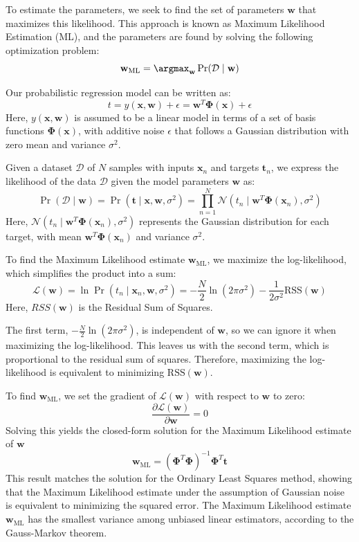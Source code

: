 To estimate the parameters, we seek to find the set of parameters $\mathbf{w}$ that maximizes this likelihood.
This approach is known as Maximum Likelihood Estimation (ML), and the parameters are found by solving the following optimization problem:
\[\mathbf{w}_{\text{ML}}=\argmax_{\mathbf{w}}\Pr(\mathcal{D}\mid\mathbf{w})\]

Our probabilistic regression model can be written as:
\[t=y(\mathbf{x},\mathbf{w})+\epsilon=\mathbf{w}^T\boldsymbol{\Phi}(\mathbf{x})+\epsilon\]
Here, $y(\mathbf{x},\mathbf{w})$ is assumed to be a linear model in terms of a set of basis functions $\boldsymbol{\Phi}(\mathbf{x})$, with additive noise $\epsilon$ that follows a Gaussian distribution with zero mean and variance $\sigma^2$. 

Given a dataset $\mathcal{D}$ of $N$ samples with inputs $\mathbf{x}_n$ and targets $\mathbf{t}_n$, we express the likelihood of the data $\mathcal{D}$ given the model parameters $\mathbf{w}$ as: 
\[\Pr(\mathcal{D}\mid \mathbf{w})=\Pr(\mathbf{t}\mid\mathbf{x},\mathbf{w},\sigma^2)=\prod_{n=1}^{N}\mathcal{N}(t_n\mid\mathbf{w}^T\boldsymbol{\Phi}(\mathbf{x}_n),\sigma^2)\]
Here, $\mathcal{N}(t_n\mid\mathbf{w}^T\boldsymbol{\Phi}(\mathbf{x}_n),\sigma^2)$ represents the Gaussian distribution for each target, with mean $\mathbf{w}^T\boldsymbol{\Phi}(\mathbf{x}_n)$ and variance $\sigma^2$. 

To find the Maximum Likelihood estimate $\mathbf{w}_{\text{ML}}$, we maximize the log-likelihood, which simplifies the product into a sum:
\[\mathcal{L}(\mathbf{w})=\ln\Pr(t_n\mid \mathbf{x}_n, \mathbf{w} ,\sigma^2)=-\dfrac{N}{2}\ln(2\pi\sigma^2)-\dfrac{1}{2\sigma^2}\text{RSS}(\mathbf{w})\]
Here, $RSS(\mathbf{w})$ is the Residual Sum of Squares.

The first term, $-\frac{N}{2}\ln(2\pi\sigma^2)$, is independent of $\mathbf{w}$, so we can ignore it when maximizing the log-likelihood.
This leaves us with the second term, which is proportional to the residual sum of squares. 
Therefore, maximizing the log-likelihood is equivalent to minimizing $\text{RSS}(\mathbf{w})$. 

To find $\mathbf{w}_{\text{ML}}$, we set the gradient of $\mathcal{L}(\mathbf{w})$ with respect to $\mathbf{w}$ to zero: 
\[\dfrac{\partial \mathcal{L}(\mathbf{w})}{\partial\mathbf{w}}=0\]
Solving this yields the closed-form solution for the Maximum Likelihood estimate of $\mathbf{w}$
\[\mathbf{w}_{\text{ML}}={\left( \boldsymbol{\Phi}^T\boldsymbol{\Phi} \right)}^{-1}\boldsymbol{\Phi}^T\mathbf{t}\]
This result matches the solution for the Ordinary Least Squares method, showing that the Maximum Likelihood estimate under the assumption of Gaussian noise is equivalent to minimizing the squared error.
The Maximum Likelihood estimate $\mathbf{w}_{\text{ML}}$ has the smallest variance among unbiased linear estimators, according to the Gauss-Markov theorem.

